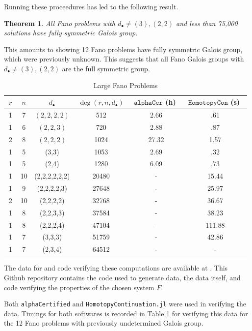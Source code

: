 \documentclass[12pt]{amsart}
\newtheorem{theorem}{Theorem}
\theoremstyle{definition}
\begin{document}
Running these proceedures has led to the following result.

\begin{theorem}
All Fano problems with $d_\bullet\ne(3),(2,2)$ and less than 75,000 solutions have fully symmetric Galois group. 
\end{theorem}

This amounts to showing 12 Fano problems have fully symmetric Galois group, which were previously unknown. This suggests that all Fano Galois groups with $d_\bullet\ne(3),(2,2)$ are the full symmetric group.

\begin{table}[htb]
  \caption{Large Fano Problems}
  \label{Big Fano}
  \def\arraystretch{1.2}
  \begin{tabular}{||c|c|c|c|c|c||}
    \hline
    $~r~$ & $~n~$ & $~d_\bullet~$ & $~\deg(r,n,d_\bullet)~$ & $~\texttt{alphaCer}$ (h)~ & $~\texttt{HomotopyCon}$ (s)~\\
    \hline\hline
    1 & 7 & $(2,2,2,2)$ & 512 & 2.66 & .61\\
    \hline
    1 & 6 & $(2,2,3)$ & 720  & 2.88 & .87\\
    \hline
    2 & 8 & $(2,2,2)$ & 1024 & 27.32 & 1.57\\
    \hline
    1 & 5 & (3,3) & 1053 & 2.69 & .32\\
    \hline
    1 & 5 & (2,4) & 1280 & 6.09 & .73\\
    \hline
    1 & 10 & (2,2,2,2,2,2) & 20480 & - & 15.44\\
    \hline
    1 & 9 & (2,2,2,2,3) & 27648 & - & 25.97\\
    \hline
    2 & 10 & (2,2,2,2) & 32768 & - & 36.67\\
    \hline
    1 & 8 & (2,2,3,3) & 37584 & - & 38.23\\
    \hline
    1 & 8 & (2,2,2,4) & 47104 & - & 111.88\\
    \hline
    1 & 7 & (3,3,3) & 51759 & - & 42.86\\
    \hline
    1 & 7 & (2,3,4) & 64512 & - & - \\
    \hline
  \end{tabular}
\end{table}

The data for and code verifying these computations are available at \cite{GithubRepo}. This Github repository contains the code used to generate data, the data itself, and code verifying the properties of the chosen system $F$. 

Both \texttt{alphaCertified} and \texttt{HomotopyContinuation.jl} were used in verifying the data. Timings for both softwares is recorded in Table \ref{Big Fano} for verifying this data for the 12 Fano problems with previously undetermined Galois group.



\end{document}
